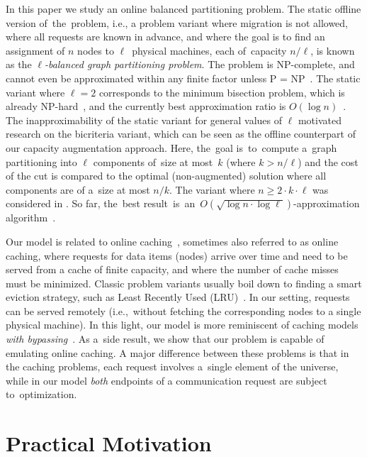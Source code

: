 \documentclass[manuscript,screen=true]{acmart}
\begin{document}
In this paper we study an online balanced partitioning problem.
The static offline version of~the~problem, i.e., a problem variant where
migration is not allowed, where all requests are known in advance, and where
the goal is to find an assignment of $n$ nodes to $\ell$~physical machines, each of~capacity $n/\ell$, is known as the
\emph{$\ell$-balanced graph partitioning problem}. The problem is 
NP-complete, and cannot even be approximated within any finite factor unless P
= NP~\cite{AndRae06}.  The static
variant where $\ell = 2$ corresponds to the minimum bisection problem, which
is already NP-hard~\cite{GaJoSt76}, and 
the currently best approximation ratio is $O(\log n)$~\cite{SarVaz95,ArKaKa99,FeKrNi00,FeiKra02,KraFei06,Raec08}.
The inapproximability of the static variant for general values of $\ell$
motivated research on the bicriteria variant, which can be seen as the offline
counterpart of our capacity augmentation approach. Here, the~goal
is~to~compute a~graph partitioning into $\ell$ components of~size at most~$k$ (where $k > n/\ell$) and the cost of the cut is compared to the optimal (non-augmented)
solution where all components are of a~size at most $n/k$. The variant where
$n \geq 2 \cdot k \cdot \ell$ was considered in
\cite{LeMaTr90,SimTen97,EvNaRS00,EvNaRS99,KrNaSc09}. So far, the~best result~is~an~$O(\!\sqrt{\log n \cdot \log \ell})$-approximation algorithm~\cite{KrNaSc09}.

Our model is related to online
caching~\cite{SleTar85,FKLMSY91,McGSle91,AcChNo00}, sometimes also referred to
as online caching, where requests for data items (nodes) arrive over time and
need to be served from a cache of finite capacity, and where the number of
cache misses must be minimized. Classic problem variants usually boil down to
finding a smart eviction strategy, such as Least Recently Used (LRU)~\cite{SleTar85}. In our
setting, requests can be served remotely (i.e.,~without fetching the
corresponding nodes to a single physical machine). In this light, our model is more
reminiscent of caching models \emph{with
bypassing}~\cite{EpImLN11,EpImLN15,Irani02}. As a~side result, we show that our problem is
capable of emulating online caching.
A major difference between  these problems is that in the caching problems, each request involves a~single element of the universe, while in our model \emph{both} endpoints of a communication request are subject to~optimization.

\section{Practical Motivation}
\end{document}
